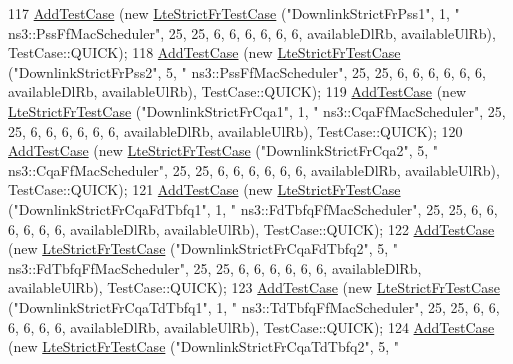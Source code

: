 \begin{DoxyCode}
117   \hyperlink{classns3_1_1TestCase_a3718088e3eefd5d6454569d2e0ddd835}{AddTestCase} (\textcolor{keyword}{new} \hyperlink{classLteStrictFrTestCase}{LteStrictFrTestCase} (\textcolor{stringliteral}{"DownlinkStrictFrPss1"}, 1, \textcolor{stringliteral}{"
      ns3::PssFfMacScheduler"}, 25, 25, 6, 6, 6, 6, 6, 6, availableDlRb, availableUlRb), TestCase::QUICK);
118   \hyperlink{classns3_1_1TestCase_a3718088e3eefd5d6454569d2e0ddd835}{AddTestCase} (\textcolor{keyword}{new} \hyperlink{classLteStrictFrTestCase}{LteStrictFrTestCase} (\textcolor{stringliteral}{"DownlinkStrictFrPss2"}, 5, \textcolor{stringliteral}{"
      ns3::PssFfMacScheduler"}, 25, 25, 6, 6, 6, 6, 6, 6, availableDlRb, availableUlRb), TestCase::QUICK);
119   \hyperlink{classns3_1_1TestCase_a3718088e3eefd5d6454569d2e0ddd835}{AddTestCase} (\textcolor{keyword}{new} \hyperlink{classLteStrictFrTestCase}{LteStrictFrTestCase} (\textcolor{stringliteral}{"DownlinkStrictFrCqa1"}, 1, \textcolor{stringliteral}{"
      ns3::CqaFfMacScheduler"}, 25, 25, 6, 6, 6, 6, 6, 6, availableDlRb, availableUlRb), TestCase::QUICK);
120   \hyperlink{classns3_1_1TestCase_a3718088e3eefd5d6454569d2e0ddd835}{AddTestCase} (\textcolor{keyword}{new} \hyperlink{classLteStrictFrTestCase}{LteStrictFrTestCase} (\textcolor{stringliteral}{"DownlinkStrictFrCqa2"}, 5, \textcolor{stringliteral}{"
      ns3::CqaFfMacScheduler"}, 25, 25, 6, 6, 6, 6, 6, 6, availableDlRb, availableUlRb), TestCase::QUICK);
121   \hyperlink{classns3_1_1TestCase_a3718088e3eefd5d6454569d2e0ddd835}{AddTestCase} (\textcolor{keyword}{new} \hyperlink{classLteStrictFrTestCase}{LteStrictFrTestCase} (\textcolor{stringliteral}{"DownlinkStrictFrCqaFdTbfq1"}, 1, \textcolor{stringliteral}{"
      ns3::FdTbfqFfMacScheduler"}, 25, 25, 6, 6, 6, 6, 6, 6, availableDlRb, availableUlRb), TestCase::QUICK);
122   \hyperlink{classns3_1_1TestCase_a3718088e3eefd5d6454569d2e0ddd835}{AddTestCase} (\textcolor{keyword}{new} \hyperlink{classLteStrictFrTestCase}{LteStrictFrTestCase} (\textcolor{stringliteral}{"DownlinkStrictFrCqaFdTbfq2"}, 5, \textcolor{stringliteral}{"
      ns3::FdTbfqFfMacScheduler"}, 25, 25, 6, 6, 6, 6, 6, 6, availableDlRb, availableUlRb), TestCase::QUICK);
123   \hyperlink{classns3_1_1TestCase_a3718088e3eefd5d6454569d2e0ddd835}{AddTestCase} (\textcolor{keyword}{new} \hyperlink{classLteStrictFrTestCase}{LteStrictFrTestCase} (\textcolor{stringliteral}{"DownlinkStrictFrCqaTdTbfq1"}, 1, \textcolor{stringliteral}{"
      ns3::TdTbfqFfMacScheduler"}, 25, 25, 6, 6, 6, 6, 6, 6, availableDlRb, availableUlRb), TestCase::QUICK);
124   \hyperlink{classns3_1_1TestCase_a3718088e3eefd5d6454569d2e0ddd835}{AddTestCase} (\textcolor{keyword}{new} \hyperlink{classLteStrictFrTestCase}{LteStrictFrTestCase} (\textcolor{stringliteral}{"DownlinkStrictFrCqaTdTbfq2"}, 5, \textcolor{stringliteral}{"
}
\end{DoxyCode}
